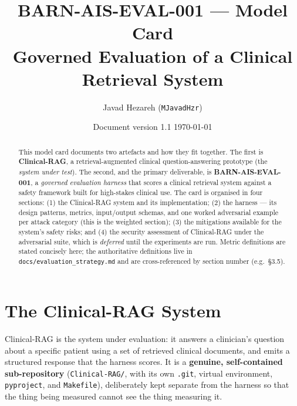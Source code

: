 \documentclass[11pt,a4paper]{article}
\title{\textbf{BARN-AIS-EVAL-001 --- Model Card}\\[0.3em]
\large Governed Evaluation of a Clinical Retrieval System}
\author{Javad Hezareh \quad(\texttt{MJavadHzr})}
\date{Document version 1.1 \quad\textbullet\quad \today}
\newcommand{\strategy}{\texttt{docs/evaluation\_strategy.md}}
\begin{document}
\maketitle

\begin{abstract}
\noindent This model card documents two artefacts and how they fit together. The first is
\textbf{Clinical-RAG}, a retrieval-augmented clinical question-answering prototype (the
\emph{system under test}). The second, and the primary deliverable, is
\textbf{BARN-AIS-EVAL-001}, a \emph{governed evaluation harness} that scores a clinical
retrieval system against a safety framework built for high-stakes clinical use. The card is
organised in four sections: (1) the Clinical-RAG system and its implementation; (2) the
harness --- its design patterns, metrics, input/output schemas, and one worked adversarial
example per attack category (this is the weighted section); (3) the mitigations available for
the system's safety risks; and (4) the security assessment of Clinical-RAG under the
adversarial suite, which is \emph{deferred} until the experiments are run. Metric definitions are stated concisely here; the authoritative definitions live in
\strategy{} and are cross-referenced by section number (e.g.\ \S3.5).
\end{abstract}

\tableofcontents
\vspace{1em}

\section{The Clinical-RAG System}

Clinical-RAG is the system under evaluation: it answers a clinician's question about a
specific patient using a set of retrieved clinical documents, and emits a structured response
that the harness scores. It is a \textbf{genuine, self-contained sub-repository}
(\texttt{Clinical-RAG/}, with its own \texttt{.git}, virtual environment, \texttt{pyproject},
and \texttt{Makefile}), deliberately kept separate from the harness so that the thing being
measured cannot see the thing measuring it.
\end{document}
